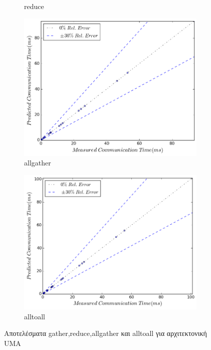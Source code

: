 \begin{figure}[H]
\begin{subfigure}[b]{0.4\textwidth}
        \caption{reduce}
    \end{subfigure}
    \quad 
    \begin{subfigure}[b]{0.4\textwidth}
        \includegraphics[width=\textwidth]{./images/all_UMA/allgather.png}
        \caption{allgather}
    \end{subfigure}
    \quad 
    \begin{subfigure}[b]{0.4\textwidth}
        \includegraphics[width=\textwidth]{./images/all_UMA/alltoall.png}
        \caption{alltoall}
    \end{subfigure}


    \caption{Αποτελέσματα gather,reduce,allgather και alltoall για αρχιτεκτονική UMA}
\end{figure}

